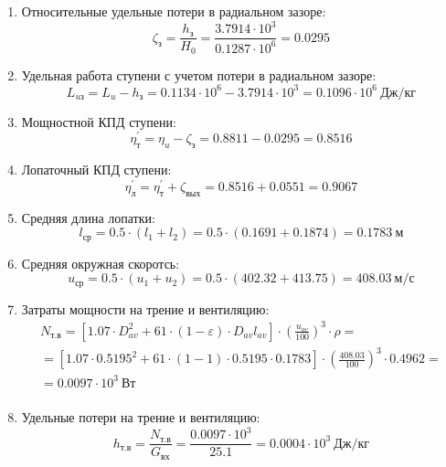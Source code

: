 \documentclass[a4paper,10pt]{article}
\begin{document}
\begin{enumerate}
        \item Относительные удельные потери в радиальном зазоре:
        \[
            \zeta_з = \frac{ h_з }{ H_0 } =
                \frac{ 3.7914 \cdot 10^3 }{ 0.1287 \cdot 10^6 } =
            0.0295
        \]

        \item Удельная работа ступени с учетом потери в радиальном зазоре:
        \[
            L_{uз} = L_u - h_з = 0.1134 \cdot 10^6 -
                3.7914 \cdot 10^3 =
            0.1096 \cdot 10^6 \ Дж/кг
        \]

        \item Мощностной КПД ступени:
        \[
            \eta_т^\prime = \eta_u - \zeta_з =
                0.8811 - 0.0295 = 0.8516
        \]

        \item Лопаточный КПД ступени:
        \[
            \eta_л^\prime = \eta_т^\prime + \zeta_{вых} =
                 0.8516 +  0.0551 =
            0.9067
        \]

        \item Средняя длина лопатки:
        \[
            l_{ср} = 0.5 \cdot (l_1 + l_2) =
                0.5 \cdot (0.1691 + 0.1874) =
            0.1783\ м
        \]

        \item Средняя окружная скоротсь:
        \[
            u_{ср} = 0.5 \cdot (u_1 + u_2) =
                0.5 \cdot (402.32 + 413.75) =
            408.03\ м/с
        \]

        \item Затраты мощности на трение и вентиляцию:
        \begin{gather*}
            N_{т.в} = \left[
                    1.07 \cdot D_{av}^2 + 61 \cdot (1 - \varepsilon) \cdot D_{av} l_{av}
            \right] \cdot
            \left(
                \frac{ u_{av} }{ 100 }
            \right) ^ 3 \cdot
            \rho =\\
            = \left[
                1.07 \cdot 0.5195^2 +
                61 \cdot (1 - 1) \cdot
                0.5195 \cdot 0.1783
            \right] \cdot
            \left(
                \frac{ 408.03 }{ 100 }
            \right) ^ 3 \cdot
            0.4962=\\
            = 0.0097 \cdot 10^3 \ Вт \\
        \end{gather*}

        \item Удельные потери на трение и вентиляцию:
        \[
            h_{т.в} = \frac{ N_{т.в} }{ G_{вх} } =
                \frac{
                    0.0097 \cdot 10^3
                }{
                    25.1
                }
            = 0.0004 \cdot 10^3 \ Дж/кг
        \]


\end{enumerate}
\end{document}
